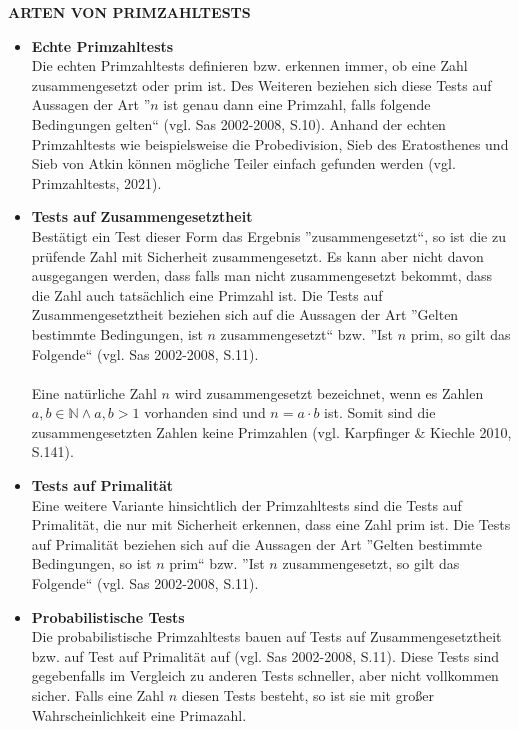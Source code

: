 \textbf{ARTEN VON PRIMZAHLTESTS}
\begin{itemize}
 \item \textbf{Echte Primzahltests}\\
    Die echten Primzahltests definieren bzw. erkennen immer,
    ob eine Zahl zusammengesetzt oder prim ist. Des Weiteren
    beziehen sich diese Tests auf Aussagen der Art ''$n$ ist
    genau dann eine Primzahl, falls folgende Bedingungen
    gelten`` (vgl. Sas 2002-2008, S.10). Anhand der echten
    Primzahltests wie beispielsweise die Probedivision,
    Sieb des Eratosthenes und Sieb von Atkin können mögliche
    Teiler einfach gefunden werden (vgl. Primzahltests, 2021).
 \item \textbf{Tests auf Zusammengesetztheit}\\
    Bestätigt ein Test dieser Form das Ergebnis
    ''zusammengesetzt``, so ist die zu prüfende Zahl mit
    Sicherheit zusammengesetzt. Es kann aber nicht davon
    ausgegangen werden, dass falls man nicht zusammengesetzt
    bekommt, dass die Zahl auch tatsächlich eine Primzahl ist.
    Die Tests auf Zusammengesetztheit beziehen sich auf die
    Aussagen der Art ''Gelten bestimmte Bedingungen, ist $n$
    zusammengesetzt`` bzw. ''Ist $n$ prim, so gilt das
    Folgende`` (vgl. Sas 2002-2008, S.11).\\\\
    Eine natürliche Zahl $n$ wird zusammengesetzt bezeichnet,
    wenn es Zahlen $a,b \in\mathbb{N} \land a,b > 1$ vorhanden
    sind und $n = a\cdot b$ ist. Somit sind die
    zusammengesetzten Zahlen keine Primzahlen
    (vgl. Karpfinger \& Kiechle 2010, S.141).
 \item \textbf{Tests auf Primalität}\\
    Eine weitere Variante hinsichtlich der Primzahltests
    sind die Tests auf Primalität, die nur mit Sicherheit
    erkennen, dass eine Zahl prim ist. Die Tests auf Primalität
    beziehen sich auf die Aussagen der Art ''Gelten bestimmte
    Bedingungen, so ist $n$ prim`` bzw. ''Ist $n$
    zusammengesetzt, so gilt das Folgende``
    (vgl. Sas 2002-2008, S.11).
 \item \textbf{Probabilistische Tests}\\
    Die probabilistische Primzahltests bauen auf Tests auf
    Zusammengesetztheit bzw. auf Test auf Primalität auf
    (vgl. Sas 2002-2008, S.11). Diese Tests sind gegebenfalls
    im Vergleich zu anderen Tests schneller, aber nicht
    vollkommen sicher. Falls eine Zahl $n$ diesen Tests besteht,
    so ist sie mit großer Wahrscheinlichkeit eine Primazahl.

\end{itemize}
